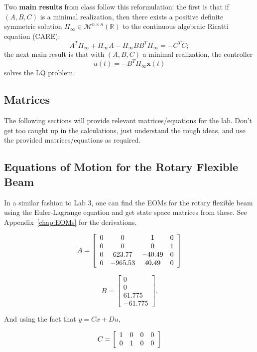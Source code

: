 Two \textbf{main results} from class follow this reformulation: the first is that if $(A,B,C)$ is a minimal realization, then there exists a positive definite symmetric solution $\Pi_{\infty} \in \mathcal{M}^{n \times n}(\mathbb{R})$ to the continuous algebraic Ricatti equation (CARE):
\[
    A^T \Pi_{\infty} + \Pi_{\infty} A - \Pi_{\infty} B B^T \Pi_{\infty} = -C^T C;
\]
the next main result is that with $(A,B,C)$ a minimal realization, the controller
\[
    u(t) = -B^T \Pi_{\infty} \mathbf{x}(t)
\]
solves the LQ problem.

\subsection{Matrices}\label{section:lab4_prelab}
The following sections will provide relevant matrices/equations for the lab. Don't get too caught up in the calculations, just understand the rough ideas, and use the provided matrices/equations as required.

\subsection{Equations of Motion for the Rotary Flexible Beam}
In a similar fashion to Lab 3, one can find the EOMs for the rotary flexible beam using the Euler-Lagrange equation and get state space matrices from these. See Appendix~\ref{chap:EOMs} for the derivations.

\[
    A =
    \left[\begin{array}{c c c c}
            0 & 0       & 1      & 0 \\
            0 & 0       & 0      & 1 \\
            0 & 623.77  & -40.49 & 0 \\
            0 & -965.53 & 40.49  & 0
        \end{array}\right]
\]

\[
    B =
    \left[\begin{array}{c}
            0      \\
            0      \\
            61.775 \\
            -61.775
        \end{array}\right].
\]

And using the fact that \(y = Cx + Du\),

\[
    C =
    \left[\begin{array}{c c c c}
            1 & 0 & 0 & 0 \\
            0 & 1 & 0 & 0
        \end{array}\right]
\]

